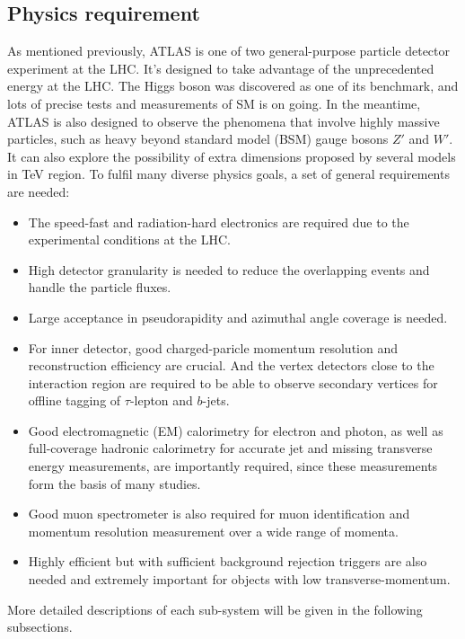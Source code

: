 \subsection{Physics requirement}

As mentioned previously, ATLAS is one of two general-purpose particle detector experiment at the LHC.
It's designed to take advantage of the unprecedented energy at the LHC.
The Higgs boson was discovered as one of its benchmark, and lots of precise tests and measurements of SM is on going.
In the meantime, ATLAS is also designed to observe the phenomena that involve highly massive particles, such as heavy beyond standard model (BSM) gauge bosons $Z'$ and $W'$.
It can also explore the possibility of extra dimensions proposed by several models in TeV region.
To fulfil many diverse physics goals, a set of general requirements are needed:
\begin{itemize}
	\item The speed-fast and radiation-hard electronics are required due to the experimental conditions at the LHC. 
	\item High detector granularity is needed to reduce the overlapping events and handle the particle fluxes.
	\item Large acceptance in pseudorapidity and azimuthal angle coverage is needed.
	\item For inner detector, good charged-paricle momentum resolution and reconstruction efficiency are crucial. And the vertex detectors close to the interaction region are required to be able to observe secondary vertices for offline tagging of $\tau$-lepton and $b$-jets.
	\item Good electromagnetic (EM) calorimetry for electron and photon, as well as full-coverage hadronic calorimetry for accurate jet and missing transverse energy measurements, are importantly required, since these measurements form the basis of many studies.
	\item Good muon spectrometer is also required for muon identification and momentum resolution measurement over a wide range of momenta.
	\item Highly efficient but with sufficient background rejection triggers are also needed and extremely important for objects with low transverse-momentum. 
\end{itemize}

More detailed descriptions of each sub-system will be given in the following subsections.
